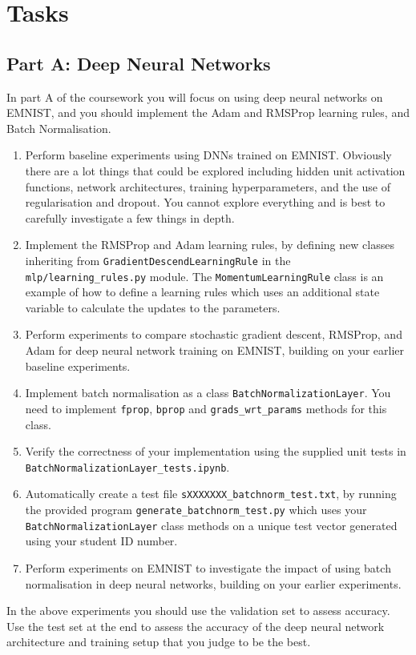 \documentclass[11pt,]{article}
\begin{document}
\section{Tasks}

\subsection*{Part A: Deep Neural Networks}
In part A of the coursework you will focus on using deep neural networks on EMNIST, and you should implement the Adam and RMSProp learning rules, and Batch Normalisation.
\begin{enumerate}
  \item Perform baseline experiments using DNNs trained on EMNIST.  Obviously there are a lot things that could be explored including hidden unit activation functions, network architectures, training hyperparameters, and the use of regularisation and dropout.   You cannot explore everything and is best to carefully investigate a few things in depth.
  \item Implement the RMSProp \citep{tieleman2012rmsprop} and Adam \citep{kingma2015adam} learning rules, by defining new classes inheriting from \texttt{GradientDescendLearningRule} in the \texttt{mlp/learning\_rules.py} module. The \texttt{MomentumLearningRule} class is an example of how to define  a learning rules which uses an additional state variable to calculate the updates to the parameters.
  \item Perform experiments to compare stochastic gradient descent, RMSProp, and Adam for deep neural network training on EMNIST, building on your earlier baseline experiments.  
  \item Implement batch normalisation \citep{ioffe2015batch} as a class \verb+BatchNormalizationLayer+.  You need to implement \texttt{fprop}, \texttt{bprop} and \texttt{grads\_wrt\_params} methods for this class. 
  \item Verify the correctness of your implementation using the supplied unit tests in\\\verb+BatchNormalizationLayer_tests.ipynb+.
  \item Automatically create a test file \verb+sXXXXXXX_batchnorm_test.txt+, by running the provided program \verb+generate_batchnorm_test.py+ which uses your \verb+BatchNormalizationLayer+ class methods on a unique test vector generated using your student ID number.
  \item Perform experiments on EMNIST to investigate the impact of using batch normalisation in deep neural networks, building on your earlier experiments.  
\end{enumerate}
In the above experiments you should use the validation set to assess accuracy.  Use the test set at the end to assess the accuracy of the deep neural network architecture and training setup that you judge to be the best.
\end{document}
